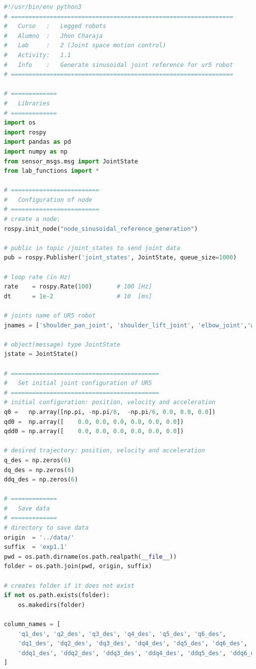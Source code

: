 \documentclass[12pt, a4paper]{article}
\begin{document}
\begin{lstlisting}[language=Python,caption=Main code.]
#!/usr/bin/env python3
# ===============================================================
#	Curso   :   Legged robots
# 	Alumno  :   Jhon Charaja
#   Lab     :   2 (Joint space motion control)
#   Activity:   1.1
# 	Info	:	Generate sinusoidal joint reference for ur5 robot
# ===============================================================

# =============
#   Libraries
# ============= 
import os
import rospy
import pandas as pd
import numpy as np
from sensor_msgs.msg import JointState
from lab_functions import *

# =========================
#   Configuration of node
# =========================
# create a node: 
rospy.init_node("node_sinusoidal_reference_generation")

# public in topic /joint_states	to send joint data	
pub = rospy.Publisher('joint_states', JointState, queue_size=1000)

# loop rate (in Hz)
rate 	= rospy.Rate(100)		# 100 [Hz]
dt 		= 1e-2					# 10  [ms]

# joints name of UR5 robot
jnames = ['shoulder_pan_joint', 'shoulder_lift_joint', 'elbow_joint','wrist_1_joint', 'wrist_2_joint', 'wrist_3_joint']

# object(message) type JointState
jstate = JointState()

# ==========================================
#   Set initial joint configuration of UR5
# ==========================================
# initial configuration: position, velocity and acceleration 
q0 =   np.array([np.pi, -np.pi/8,  -np.pi/6, 0.0, 0.0, 0.0])
qd0 =  np.array([    0.0, 0.0, 0.0, 0.0, 0.0, 0.0])
qdd0 = np.array([    0.0, 0.0, 0.0, 0.0, 0.0, 0.0]) 

# desired trajectory: position, velocity and acceleration
q_des = np.zeros(6)
dq_des = np.zeros(6)
ddq_des = np.zeros(6)

# =============
#   Save data
# =============
# directory to save data
origin 	= '../data/'
suffix 	= 'exp1.1'
pwd = os.path.dirname(os.path.realpath(__file__))
folder = os.path.join(pwd, origin, suffix)

# creates folder if it does not exist
if not os.path.exists(folder):
    os.makedirs(folder)

column_names = [
    'q1_des', 'q2_des', 'q3_des', 'q4_des', 'q5_des', 'q6_des',
    'dq1_des', 'dq2_des', 'dq3_des', 'dq4_des', 'dq5_des', 'dq6_des',
    'ddq1_des', 'ddq2_des', 'ddq3_des', 'ddq4_des', 'ddq5_des', 'ddq6_des' 
]


\end{lstlisting}
\end{document}
